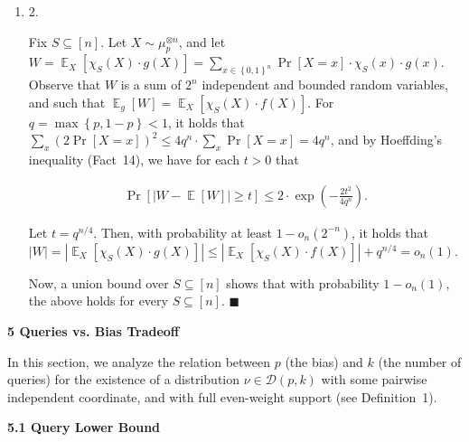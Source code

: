 \documentclass[10pt,a4paper]{article}
\begin{document}
\begin{enumerate}
\item[] 
2. 


Fix $S\subseteq[n]$. Let $X\sim\mu_{p}^{\otimes n}$, and let $W=\mathop{\mathbb{E}}_{X}\left[\chi_{S}(X)\cdot g(X)\right]=\sum_{x\in\left\{0,1\right\}^{n}}\Pr\left[X=x\right]\cdot\chi_{S}(x)\cdot g(x)$. Observe that $W$ is a sum of $2^{n}$ independent and bounded random variables, and such that $\mathop{\mathbb{E}}_{g}[W]=\mathop{\mathbb{E}}_{X}\left[\chi_{S}(X)\cdot f(X)\right]$. For $q=\max\left\{p,1-p\right\}<1$, it holds that $\sum_{x}(2\Pr[X=x])^{2}\leqslant 4q^{n}\cdot\sum_{x}\Pr[X=x]=4q^{n}$, and by Hoeffding’s inequality (Fact 14), we have for each $t>0$ that\par


\[\begin{gathered}
\Pr\left[\left|W-\mathop{\mathbb{E}}[W]\right|\geqslant t\right]\leqslant 2\cdot\exp\left(-\frac{2t^{2}}{4q^{n}}\right).
\end{gathered}\]


Let $t=q^{n/4}$.
Then, with probability at least $1-o_{n}(2^{-n})$, it holds that $\left|W\right|=\left|\mathop{\mathbb{E}}_{X}\left[\chi_{S}(X)\cdot g(X)\right]\right|\leqslant\left|\mathop{\mathbb{E}}_{X}\left[\chi_{S}(X)\cdot f(X)\right]\right|+q^{n/4}=o_{n}(1).$\par




Now, a union bound over $S\subseteq[n]$ shows that with probability $1-o_{n}(1)$, the above holds for every $S\subseteq[n]$.
\ensuremath{\blacksquare}\par





\end{enumerate}






\par\medskip\noindent\textbf{
5 Queries vs. Bias Tradeoff}\par




In this section, we analyze the relation between $p$ (the bias) and $k$ (the number of queries) for the existence of a distribution $\nu\in\mathcal{D}(p,k)$ with some pairwise independent coordinate, and with full even-weight support (see Definition 1).\par




\par\medskip\noindent\textbf{
5.1 Query Lower Bound}\par
\end{document}
